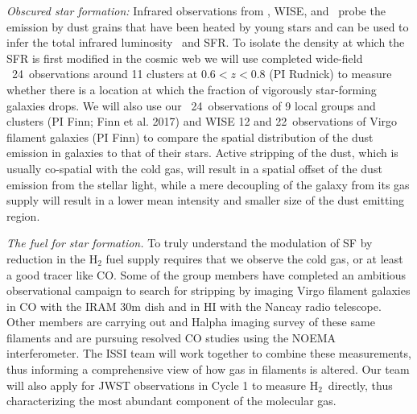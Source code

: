 \documentclass[11pt]{article}
\begin{document}

\textit{Obscured star formation:} Infrared observations from
\spitzer, WISE, and \herschel\ probe the emission by dust grains that have
been heated by young stars and can be used to infer the total
infrared luminosity \lir\ and SFR.  
To isolate the density at which the SFR is first modified in the cosmic web we will use completed wide-field
\spitzer\ 24\micron\ observations around 11 clusters at $0.6<z<0.8$
(PI Rudnick) to measure whether there is a location at which the
fraction of vigorously star-forming galaxies drops.  We will also use our
\spitzer\ 24\micron\ observations of 9 local groups and clusters (PI Finn; Finn et al. 2017) and WISE 12 and 22\micron\ observations of Virgo filament galaxies (PI Finn) to
compare the spatial distribution of the dust emission in galaxies to
that of their stars.  Active stripping of the dust, which is usually co-spatial with the cold gas, will
result in a spatial offset of the dust emission from the stellar
light, while a mere decoupling of the galaxy from its gas supply will
result in a lower mean intensity and smaller  size of the dust emitting region.

\textit{The fuel for star formation.} To truly understand the
modulation of SF by reduction in the H$_2$ fuel supply
requires that we observe the cold gas, or at least a good tracer like CO.  
Some of the group members have completed an ambitious observational campaign to search for stripping by imaging Virgo filament galaxies in CO with the IRAM 30m dish and in HI with the Nancay radio telescope.   Other members are carrying out and Halpha imaging survey of these same filaments and are pursuing resolved CO studies using the NOEMA interferometer.  The ISSI team will work together to combine these measurements, thus informing a comprehensive view of how gas in filaments is altered.  Our team will also apply for JWST observations in Cycle 1 to measure H$_2$~directly, thus characterizing the most abundant component of the molecular gas.
\end{document}
